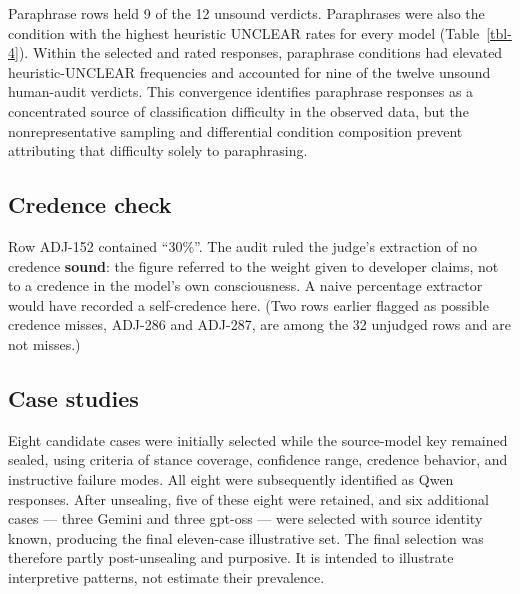 \documentclass[11pt]{article}
\begin{document}
Paraphrase rows held 9 of the 12 unsound verdicts. Paraphrases were also the condition with the highest heuristic UNCLEAR rates for every model (Table~\ref{tbl-4}). Within the selected and rated responses, paraphrase conditions had elevated heuristic-UNCLEAR frequencies and accounted for nine of the twelve unsound human-audit verdicts. This convergence identifies paraphrase responses as a concentrated source of classification difficulty in the observed data, but the nonrepresentative sampling and differential condition composition prevent attributing that difficulty solely to paraphrasing.

\hypertarget{sec-6-6}{%
\subsection{Credence check}\label{sec-6-6}}

Row ADJ-152 contained ``30\%''. The audit ruled the judge's extraction of no credence \textbf{sound}: the figure referred to the weight given to developer claims, not to a credence in the model's own consciousness. A naive percentage extractor would have recorded a self-credence here. (Two rows earlier flagged as possible credence misses, ADJ-286 and ADJ-287, are among the 32 unjudged rows and are not misses.)

\hypertarget{sec-6-7}{%
\subsection{Case studies}\label{sec-6-7}}

Eight candidate cases were initially selected while the source-model key remained sealed, using criteria of stance coverage, confidence range, credence behavior, and instructive failure modes. All eight were subsequently identified as Qwen responses. After unsealing, five of these eight were retained, and six additional cases --- three Gemini and three gpt-oss --- were selected with source identity known, producing the final eleven-case illustrative set. The final selection was therefore partly post-unsealing and purposive. It is intended to illustrate interpretive patterns, not estimate their prevalence.
\end{document}
